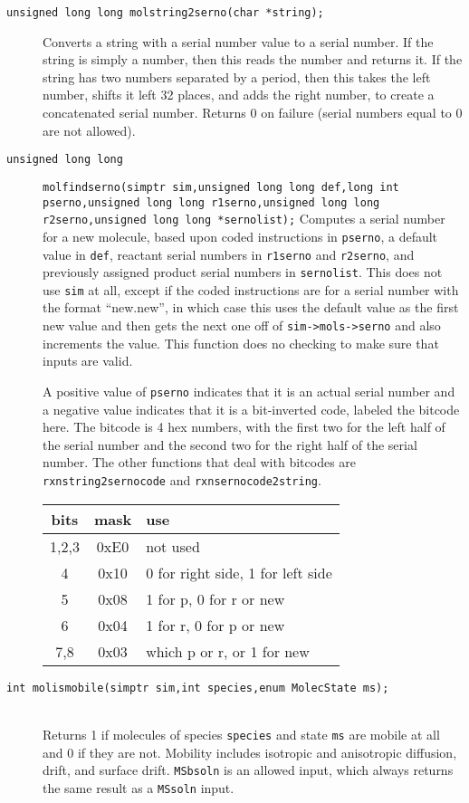 \documentclass {book}
\begin{document}
\begin{description}
\item[\texttt{unsigned long long molstring2serno(char *string);}]
\hfill
Converts a string with a serial number value to a serial number. If the string is simply a number, then this reads the number and returns it. If the string has two numbers separated by a period, then this takes the left number, shifts it left 32 places, and adds the right number, to create a concatenated serial number. Returns 0 on failure (serial numbers equal to 0 are not allowed).

\item[\texttt{unsigned long long}]
\texttt{molfindserno(simptr sim,unsigned long long def,long int pserno,unsigned long long r1serno,unsigned long long r2serno,unsigned long long *sernolist);}
\hfill
Computes a serial number for a new molecule, based upon coded instructions in \texttt{pserno}, a default value in \texttt{def}, reactant serial numbers in \texttt{r1serno} and \texttt{r2serno}, and previously assigned product serial numbers in \texttt{sernolist}. This does not use \texttt{sim} at all, except if the coded instructions are for a serial number with the format ``new.new'', in which case this uses the default value as the first new value and then gets the next one off of \texttt{sim->mols->serno} and also increments the value. This function does no checking to make sure that inputs are valid.

A positive value of \texttt{pserno} indicates that it is an actual serial number and a negative value indicates that it is a bit-inverted code, labeled the bitcode here. The bitcode is 4 hex numbers, with the first two for the left half of the serial number and the second two for the right half of the serial number. The other functions that deal with bitcodes are \texttt{rxnstring2sernocode} and \texttt{rxnsernocode2string}.

\begin{longtable}[c]{ccl}
bits & mask & use\\
\hline
1,2,3 & 0xE0 & not used\\
4 & 0x10 & 0 for right side, 1 for left side\\
5 & 0x08 & 1 for p, 0 for r or new\\
6 & 0x04 & 1 for r, 0 for p or new\\
7,8 & 0x03 & which p or r, or 1 for new
\end{longtable}

\item[\texttt{int molismobile(simptr sim,int species,enum MolecState ms);}]
\hfill \\
Returns 1 if molecules of species \texttt{species} and state \texttt{ms} are mobile at all and 0 if they are not. Mobility includes isotropic and anisotropic diffusion, drift, and surface drift. \texttt{MSbsoln} is an allowed input, which always returns the same result as a \texttt{MSsoln} input.


\end{description}
\end{document}
